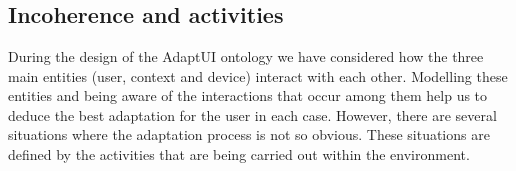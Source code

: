\section*{}

% 








\subsection{Incoherence and activities}
\label{sec:incoherence}

During the design of the AdaptUI ontology we have considered how the three
main entities (user, context and device) interact with each other. Modelling
these entities and being aware of the interactions that occur among them help
us to deduce the best adaptation for the user in each case. However, there are
several situations where the adaptation process is not so obvious. These situations
are defined by the activities that are being carried out within the environment.

